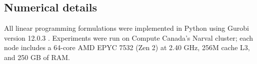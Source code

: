 \documentclass[sglanonrev]{informs4}
\begin{document}
\begin{APPENDICES}

\section{Numerical details}
\label{sec:numerical_details}

All linear programming formulations were implemented in Python using Gurobi version 12.0.3 \citep{gurobi}. Experiments were run on Compute Canada's Narval cluster; each node includes a 64-core AMD EPYC 7532 (Zen 2) at 2.40 GHz, 256M cache L3, and 250 GB of RAM. 


\end{APPENDICES}
\end{document}
